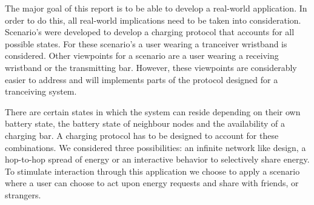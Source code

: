 The major goal of this report is to be able to develop a real-world application. In order to do this, all real-world implications need to be taken into consideration. Scenario's were developed to develop a charging protocol that accounts for all possible states. For these scenario's a user wearing a tranceiver wristband is considered. Other viewpoints for a scenario are a user wearing a receiving wristband or the transmitting bar. However, these viewpoints are considerably easier to address and will implements parts of the protocol designed for a tranceiving system.

There are certain states in which the system can reside depending on their own battery state, the battery state of neighbour nodes and the availability of a charging bar. A charging protocol has to be designed to account for these combinations. We considered three possibilities: an infinite network like design, a hop-to-hop spread of energy or an interactive behavior to selectively share energy. To stimulate interaction through this application we choose to apply a scenario where a user can choose to act upon energy requests and share with friends, or strangers.   
